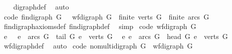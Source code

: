 \begin{isabellebody}
%
\isadelimproof
\ \ %
\endisadelimproof
%
\isatagproof
{}\isamarkupfalse%
\ digraph{\isacharunderscore}{\kern0pt}def\ \isamarkupfalse%
\ auto%
\endisatagproof
{\isafoldproof}%
%
\isadelimproof
\isanewline
%
\endisadelimproof
\ \ \ \ \ \ \ \ \ \ \ \ \ \ \ \ \isanewline
{}\isamarkupfalse%
\ {\isacharbrackleft}{\kern0pt}code{\isacharbrackright}{\kern0pt}{\isacharcolon}{\kern0pt}\ {\isachardoublequoteopen}fin{\isacharunderscore}{\kern0pt}digraph\ G\ {\isacharequal}{\kern0pt}\ \ {\isacharparenleft}{\kern0pt}wf{\isacharunderscore}{\kern0pt}digraph\ G\ {\isasymand}\ finite\ {\isacharparenleft}{\kern0pt}verts\ G{\isacharparenright}{\kern0pt}\ {\isasymand}\ finite\ {\isacharparenleft}{\kern0pt}arcs\ G{\isacharparenright}{\kern0pt}{\isacharparenright}{\kern0pt}{\isachardoublequoteclose}\isanewline
%
\isadelimproof
\ \ %
\endisadelimproof
%
\isatagproof
{}\isamarkupfalse%
\ fin{\isacharunderscore}{\kern0pt}digraph{\isacharunderscore}{\kern0pt}axioms{\isacharunderscore}{\kern0pt}def\ fin{\isacharunderscore}{\kern0pt}digraph{\isacharunderscore}{\kern0pt}def\ \isamarkupfalse%
\ simp%
\endisatagproof
{\isafoldproof}%
%
\isadelimproof
\isanewline
%
\endisadelimproof
\isanewline
{}\isamarkupfalse%
\ {\isacharbrackleft}{\kern0pt}code{\isacharbrackright}{\kern0pt}{\isacharcolon}{\kern0pt}\ {\isachardoublequoteopen}wf{\isacharunderscore}{\kern0pt}digraph\ G\ {\isacharequal}{\kern0pt}\ {\isacharparenleft}{\kern0pt}\isanewline
\ {\isacharparenleft}{\kern0pt}{\isasymforall}e{\isachardot}{\kern0pt}\ \ \ e\ {\isasymin}\ arcs\ G\ {\isasymlongrightarrow}\ tail\ G\ e\ {\isasymin}\ verts\ G{\isacharparenright}{\kern0pt}\ {\isasymand}\isanewline
\ {\isacharparenleft}{\kern0pt}{\isasymforall}e{\isachardot}{\kern0pt}\ e\ {\isasymin}\ arcs\ G\ {\isasymlongrightarrow}\ head\ G\ e\ {\isasymin}\ verts\ G{\isacharparenright}{\kern0pt}{\isacharparenright}{\kern0pt}{\isachardoublequoteclose}\isanewline
%
\isadelimproof
\ \ %
\endisadelimproof
%
\isatagproof
{}\isamarkupfalse%
\ wf{\isacharunderscore}{\kern0pt}digraph{\isacharunderscore}{\kern0pt}def\ \isamarkupfalse%
\ auto%
\endisatagproof
{\isafoldproof}%
%
\isadelimproof
\isanewline
%
\endisadelimproof
\isanewline
{}\isamarkupfalse%
\ {\isacharbrackleft}{\kern0pt}code{\isacharbrackright}{\kern0pt}{\isacharcolon}{\kern0pt}\ {\isachardoublequoteopen}nomulti{\isacharunderscore}{\kern0pt}digraph\ G\ {\isacharequal}{\kern0pt}\ {\isacharparenleft}{\kern0pt}wf{\isacharunderscore}{\kern0pt}digraph\ G\ {\isasymand}\ \isanewline

\end{isabellebody}
